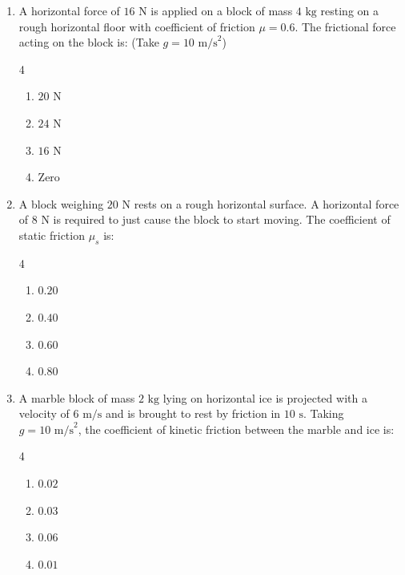 \documentclass[11pt,a4paper]{article}
\begin{document}
\begin{enumerate}[label=\textbf{\arabic*.},leftmargin=18pt,itemsep=8pt]
  \item A horizontal force of $16\text{ N}$ is applied on a block of mass $4\text{ kg}$ resting on a rough horizontal floor with coefficient of friction $\mu = 0.6$. The frictional force acting on the block is: (Take $g = 10\text{ m/s}^2$)
  \begin{multicols}{4}
    \begin{enumerate}[label=(\Alph*)]
      \item $20\text{ N}$
      \item $24\text{ N}$
      \item $16\text{ N}$
      \item $\text{Zero}$
    \end{enumerate}
  \end{multicols}

  \item A block weighing $20\text{ N}$ rests on a rough horizontal surface. A horizontal force of $8\text{ N}$ is required to just cause the block to start moving. The coefficient of static friction $\mu_s$ is:
  \begin{multicols}{4}
    \begin{enumerate}[label=(\Alph*)]
      \item $0.20$
      \item $0.40$
      \item $0.60$
      \item $0.80$
    \end{enumerate}
  \end{multicols}

  \item A marble block of mass $2\text{ kg}$ lying on horizontal ice is projected with a velocity of $6\text{ m/s}$ and is brought to rest by friction in $10\text{ s}$. Taking $g = 10\text{ m/s}^2$, the coefficient of kinetic friction between the marble and ice is:
  \begin{multicols}{4}
    \begin{enumerate}[label=(\Alph*)]
      \item $0.02$
      \item $0.03$
      \item $0.06$
      \item $0.01$
    \end{enumerate}
  \end{multicols}


\end{enumerate}
\end{document}
